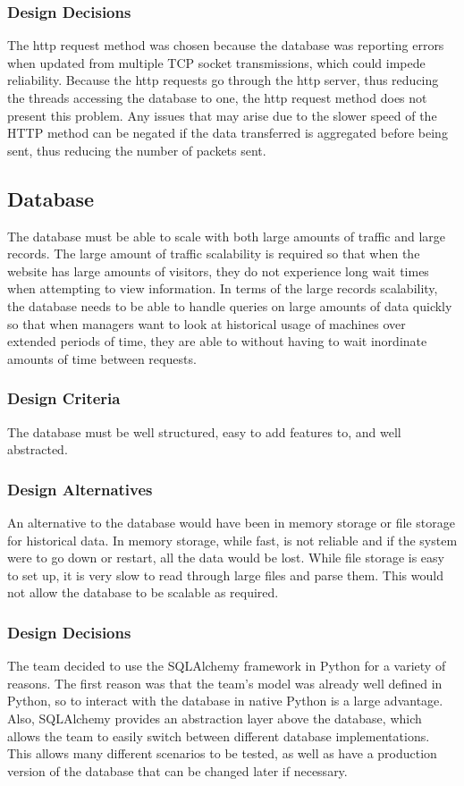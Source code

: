 \documentclass[PPFS.tex]{template/subfiles}
\begin{document}
\subsubsection{Design Decisions}
The http request method was chosen because the database was reporting errors when updated from multiple TCP socket transmissions, which could impede reliability. Because the http requests go through the http server, thus reducing the threads accessing the database to one, the http request method does not present this problem. Any issues that may arise due to the slower speed of the HTTP method can be negated if the data transferred is aggregated before being sent, thus reducing the number of packets sent.

\subsection{Database}
The database must be able to scale with both large amounts of traffic and large records. The large amount of traffic scalability is required so that when the website has large amounts of visitors, they do not experience long wait times when attempting to view information. In terms of the large records scalability, the database needs to be able to handle queries on large amounts of data quickly so that when managers want to look at historical usage of machines over extended periods of time, they are able to without having to wait inordinate amounts of time between requests.

\subsubsection{Design Criteria}
The database must be well structured, easy to add features to, and well abstracted.

\subsubsection{Design Alternatives}
An alternative to the database would have been in memory storage or file storage for historical data. In memory storage, while fast, is not reliable and if the system were to go down or restart, all the data would be lost. While file storage is easy to set up, it is very slow to read through large files and parse them. This would not allow the database to be scalable as required.

\subsubsection{Design Decisions}
The team decided to use the SQLAlchemy framework in Python for a variety of reasons. The first reason was that the team's model was already well defined in Python, so to interact with the database in native Python is a large advantage. Also, SQLAlchemy provides an abstraction layer above the database, which allows the team to easily switch between different database implementations. This allows many different scenarios to be tested, as well as have a production version of the database that can be changed later if necessary.
\end{document}
